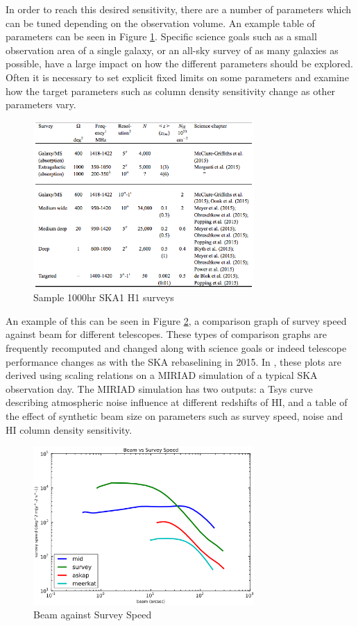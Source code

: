 \documentclass[11pt]{article}
\begin{document}
In order to reach this desired sensitivity, there are a number of parameters which can be tuned depending on the observation volume. An example table of parameters can be seen in Figure \ref{fig:surveytable1}. Specific science goals such as a small observation area of a single galaxy, or an all-sky survey of as many galaxies as possible, have a large impact on how the different parameters should be explored. Often it is necessary to set explicit fixed limits on some parameters and examine how the target parameters such as column density sensitivity change as other parameters vary.
\begin{figure}[H]
    \centering
    \includegraphics[width=0.75\textwidth]{surveytable1}
    \caption{Sample 1000hr SKA1 H1 surveys \parencite[p. 6]{lister2015}}
    \label{fig:surveytable1}
\end{figure}

An example of this can be seen in Figure \ref{fig:beamss}, a comparison graph of survey speed against beam for different telescopes. These types of comparison graphs are frequently recomputed and changed along with science goals or indeed telescope performance changes as with the SKA rebaselining in 2015. In \textcite{popping2014}, these plots are derived using scaling relations on a MIRIAD simulation of a typical SKA observation day. The MIRIAD simulation has two outputs: a Tsys curve describing atmospheric noise influence at different redshifts of HI, and a table of the effect of synthetic beam size on parameters such as survey speed, noise and HI column density sensitivity.

\begin{figure}[H]
    \centering
    \includegraphics[width=0.75\textwidth]{beamss}
    \caption{Beam against Survey Speed \parencite[p. 6]{popping2014}}
    \label{fig:beamss}
\end{figure}
\end{document}
